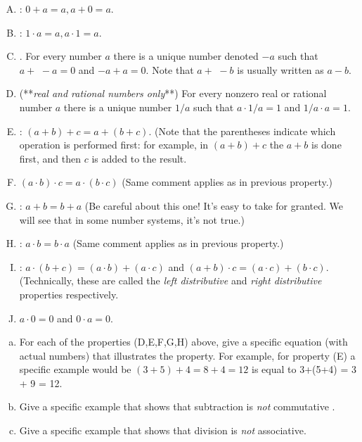 \begin{enumerate}[(A)]
\item
{}:   $0+a =a, a+0=a$.
\item
{}:   $1 \cdot a =a, a \cdot 1=a$.
\item
{}. For every number $a$ there is a unique number denoted $-a$ such that $a + \,\,-a=0$ and $-a + a = 0$.   Note that $a +\,\,-b$ is usually written as $a-b$.
\item
{} (**\emph{real and rational numbers only}**)   For every nonzero real or rational number $a$ there is a unique number $1/a$ such that $a \cdot 1/a = 1$ and $1/a \cdot a = 1$.  
\item
{}: $(a+b)+c = a+(b+c)$.  (Note that the parentheses indicate which operation is performed first: for example, in $(a+b)+c$ the $a+b$ is done first, and then $c$ is added to the result. 
\item
{} $(a\cdot b) \cdot c= a\cdot(b\cdot c)$  (Same comment applies as in previous property.)
\item
{}: $a+b = b+a$  (Be careful about this one!  It's easy to take for granted.  We will see that in some number systems, it's not true.)
\item
{}: $a\cdot b = b\cdot a$  (Same comment applies as in previous property.)
\item
{}:   $a\cdot (b + c) = (a\cdot b) + (a \cdot c)$ and $(a+b)\cdot c = (a \cdot c) + (b \cdot c)$.  (Technically, these are called the  \emph{left distributive} and \emph{right distributive} properties respectively.
\item {}
$a \cdot 0 = 0$ and $0 \cdot a = 0$.
\end {enumerate}


\begin{exercise}{1}
\begin{enumerate}[(a)]
\item
For each of the properties (D,E,F,G,H)  above, give a specific equation (with actual numbers) that illustrates the property.
For example, for property (E) a specific example would be  $(3+5)+4 = 8 + 4 = 12$ is equal to 3+(5+4) = 3 + 9 = 12. 
\item
Give a specific example  that shows that subtraction  is \emph{not} commutative 
.\item
Give a specific example  that shows that division is \emph{not} associative. 
\end{enumerate}
\end{exercise}

